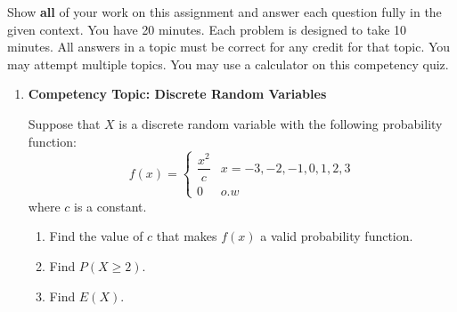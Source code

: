 \documentclass[11pt]{article}
\providecommand{\tightlist}{%
  \setlength{\itemsep}{0pt}\setlength{\parskip}{0pt}}
\begin{document}
\pagestyle{fancy} 

Show \textbf{all} of your work on this assignment and answer each question fully in the given context. You have 20 minutes. Each problem is designed to take 10 minutes. All answers in a topic must be correct for any credit for that topic. You may attempt multiple topics. You may use a calculator on this competency quiz. \\

\begin{enumerate}
\def\labelenumi{\arabic{enumi}.}
\item
  \textbf{Competency Topic: Discrete Random Variables}

  Suppose that \(X\) is a discrete random variable with the following
  probability function:
  \[f(x) = \begin{cases} \dfrac{x^2}{c} & x = -3, -2, -1, 0, 1, 2, 3 \\ 0 & o.w \end{cases}\]
  where \(c\) is a constant.

  \begin{enumerate}
  \def\labelenumii{\alph{enumii}.}
  \tightlist
  \item
    Find the value of \(c\) that makes \(f(x)\) a valid probability
    function. \vspace{4cm}
  \item
    Find \(P(X \ge 2)\). \vspace{4cm}
  \item
    Find \(E(X)\).
  \end{enumerate}
\end{enumerate}

\newpage
\end{document}
